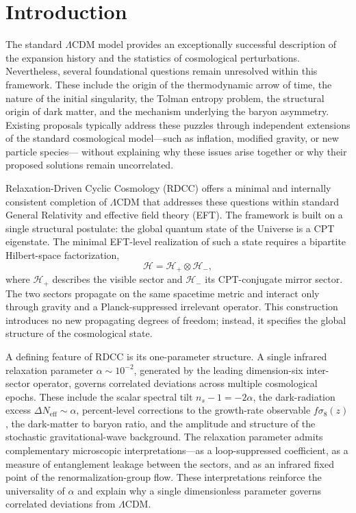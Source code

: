 \documentclass[11pt,a4paper]{article}
\begin{document}
\clearpage

\section{Introduction}

The standard $\Lambda$CDM model provides an exceptionally successful description of the
expansion history and the statistics of cosmological perturbations. Nevertheless, several
foundational questions remain unresolved within this framework. These include the origin of the
thermodynamic arrow of time, the nature of the initial singularity, the Tolman entropy problem,
the structural origin of dark matter, and the mechanism underlying the baryon asymmetry.
Existing proposals typically address these puzzles through independent extensions of the
standard cosmological model—such as inflation, modified gravity, or new particle species—
without explaining why these issues arise together or why their proposed solutions remain
uncorrelated.

Relaxation-Driven Cyclic Cosmology (RDCC) offers a minimal and internally consistent
completion of $\Lambda$CDM that addresses these questions within standard General Relativity
and effective field theory (EFT). The framework is built on a single structural postulate: the
global quantum state of the Universe is a CPT eigenstate. The minimal EFT-level realization of
such a state requires a bipartite Hilbert-space factorization,
\begin{equation}
    \mathcal{H} = \mathcal{H}_{+} \otimes \mathcal{H}_{-},
\end{equation}
where $\mathcal{H}_{+}$ describes the visible sector and $\mathcal{H}_{-}$ its CPT-conjugate
mirror sector. The two sectors propagate on the same spacetime metric and interact only through
gravity and a Planck-suppressed irrelevant operator. This construction introduces no new
propagating degrees of freedom; instead, it specifies the global structure of the cosmological
state.

A defining feature of RDCC is its one-parameter structure. A single infrared relaxation
parameter $\alpha \sim 10^{-2}$, generated by the leading dimension-six inter-sector operator,
governs correlated deviations across multiple cosmological epochs. These include the scalar
spectral tilt $n_{s}-1=-2\alpha$, the dark-radiation excess $\Delta N_{\mathrm{eff}} \sim \alpha$,
percent-level corrections to the growth-rate observable $f\sigma_{8}(z)$, the dark-matter to
baryon ratio, and the amplitude and structure of the stochastic gravitational-wave background.
The relaxation parameter admits complementary microscopic interpretations—as a
loop-suppressed coefficient, as a measure of entanglement leakage between the sectors, and as an
infrared fixed point of the renormalization-group flow. These interpretations reinforce the
universality of $\alpha$ and explain why a single dimensionless parameter governs correlated
deviations from $\Lambda$CDM.
\end{document}
